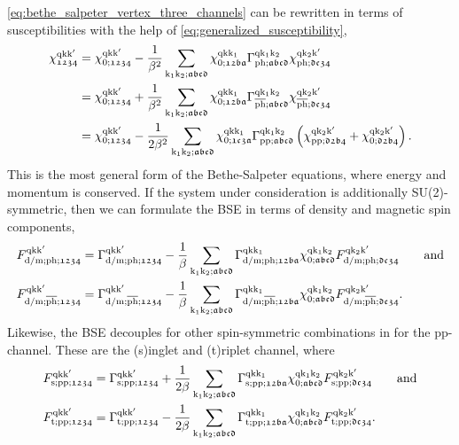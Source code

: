 \documentclass[\main/main.tex]{subfiles}
\begin{document}
\eqref{eq:bethe_salpeter_vertex_three_channels} can be rewritten in terms of susceptibilities with the help of \eqref{eq:generalized_susceptibility},
\begin{subequations}\label{eq:bethe_salpeter_susc}
\begin{align}
	\chi^{\text{q}\text{k}\text{k}'}_{\mathfrak{1234}}&=\chi^{\text{q}\text{k}\text{k}'}_{0;\mathfrak{1234}}-\frac{1}{\beta^2}\sum_{\text{k}_1\text{k}_2;\mathfrak{abcd}}\chi^{\text{q}\text{k}\text{k}_1}_{0;\mathfrak{12ba}} \Gamma^{\text{q}\text{k}_1\text{k}_2}_{\text{ph};\mathfrak{abcd}} \chi^{\text{q}\text{k}_2\text{k}'}_{\text{ph};\mathfrak{dc34}}\\
	&=\chi^{\text{q}\text{k}\text{k}'}_{0;\mathfrak{1234}}+\frac{1}{\beta^2}\sum_{\text{k}_1\text{k}_2;\mathfrak{abcd}}\chi^{\text{q}\text{k}\text{k}_1}_{0;\mathfrak{12ba}} \Gamma^{\text{q}\text{k}_1\text{k}_2}_{\overline{\text{ph}};\mathfrak{abcd}} \chi^{\text{q}\text{k}_2\text{k}'}_{\overline{\text{ph}};\mathfrak{dc34}}\\
	&=\chi^{\text{q}\text{k}\text{k}'}_{0;\mathfrak{1234}}-\frac{1}{2\beta^2}\sum_{\text{k}_1\text{k}_2;\mathfrak{abcd}}\chi^{\text{q}\text{k}\text{k}_1}_{0;\mathfrak{1c3a}}\Gamma^{\text{q}\text{k}_1\text{k}_2}_{\text{pp};\mathfrak{abcd}}\left (\chi^{\text{q}\text{k}_2\text{k}'}_{\text{pp};\mathfrak{d2b4}}+\chi^{\text{q}\text{k}_2\text{k}'}_{0;\mathfrak{d2b4}}\right )\label{eq:bethe_salpeter_susc_pp}.
\end{align}
\end{subequations}
This is the most general form of the Bethe-Salpeter equations, where energy and momentum is conserved. If the system under consideration is additionally SU(2)-symmetric, then we can formulate the BSE in terms of density and magnetic spin components,
\begin{subequations}
\begin{align}
	F_{\text{d}/\text{m};\text{ph};\mathfrak{1234}}^{\text{q}\text{k}\text{k}'}&=\Gamma_{\text{d}/\text{m};\text{ph};\mathfrak{1234}}^{\text{q}\text{k}\text{k}'}-\frac1\beta\sum_{\text{k}_1\text{k}_2;\mathfrak{abcd}} \Gamma_{\text{d}/\text{m};\text{ph};\mathfrak{12ba}}^{\text{q}\text{k}\text{k}_1} \chi_{0;\mathfrak{abcd}}^{\text{q}\text{k}_1\text{k}_2} F_{\text{d}/\text{m};\text{ph};\mathfrak{dc34}}^{\text{q}\text{k}_2\text{k}'}\qquad\text{and}\\
	F_{\text{d}/\text{m};\overline{\text{ph}};\mathfrak{1234}}^{\text{q}\text{k}\text{k}'}&=\Gamma_{\text{d}/\text{m};\overline{\text{ph}};\mathfrak{1234}}^{\text{q}\text{k}\text{k}'}-\frac1\beta\sum_{\text{k}_1\text{k}_2;\mathfrak{abcd}} \Gamma_{\text{d}/\text{m};\overline{\text{ph}};\mathfrak{12ba}}^{\text{q}\text{k}\text{k}_1} \chi_{0;\mathfrak{abcd}}^{\text{q}\text{k}_1\text{k}_2} F_{\text{d}/\text{m};\overline{\text{ph}};\mathfrak{dc34}}^{\text{q}\text{k}_2\text{k}'}.
\end{align}
\end{subequations}
Likewise, the BSE decouples for other spin-symmetric combinations in for the pp-channel. These are the (s)inglet and (t)riplet channel, where
\begin{align}
	F_{\text{s};\text{pp};\mathfrak{1234}}^{\text{q}\text{k}\text{k}'}&=\Gamma_{\text{s};\text{pp};\mathfrak{1234}}^{\text{q}\text{k}\text{k}'}+\frac{1}{2\beta}\sum_{\text{k}_1\text{k}_2;\mathfrak{abcd}} \Gamma_{\text{s};\text{pp};\mathfrak{12ba}}^{\text{q}\text{k}\text{k}_1} \chi_{0;\mathfrak{abcd}}^{\text{q}\text{k}_1\text{k}_2} F_{\text{s};\text{pp};\mathfrak{dc34}}^{\text{q}\text{k}_2\text{k}'}\qquad\text{and}\\
	F_{\text{t};\text{pp};\mathfrak{1234}}^{\text{q}\text{k}\text{k}'}&=\Gamma_{\text{t};\text{pp};\mathfrak{1234}}^{\text{q}\text{k}\text{k}'}-\frac{1}{2\beta}\sum_{\text{k}_1\text{k}_2;\mathfrak{abcd}} \Gamma_{\text{t};\text{pp};\mathfrak{12ba}}^{\text{q}\text{k}\text{k}_1} \chi_{0;\mathfrak{abcd}}^{\text{q}\text{k}_1\text{k}_2} F_{\text{t};\text{pp};\mathfrak{dc34}}^{\text{q}\text{k}_2\text{k}'}.
\end{align}
\end{document}
